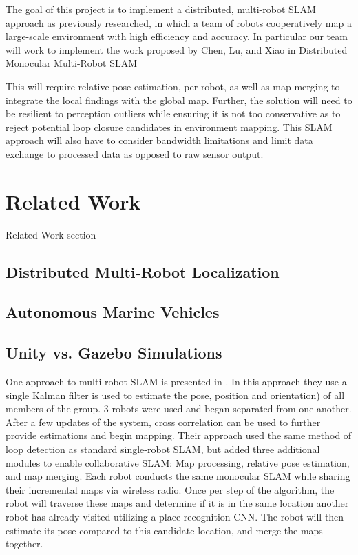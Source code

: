 \documentclass[conference]{IEEEtran}
\begin{document}
The goal of this project is to implement a distributed, multi-robot SLAM approach as previously researched, in which a team of robots cooperatively map a large-scale environment with high efficiency and accuracy. In particular our team will work to implement the work proposed by Chen, Lu, and Xiao in Distributed Monocular Multi-Robot SLAM \cite{monocular}

This will require relative pose estimation, per robot, as well as map merging to integrate the local findings with the global map. Further, the solution will need to be resilient to perception outliers while ensuring it is not too conservative as to reject potential loop closure candidates in environment mapping. This SLAM approach will also have to consider bandwidth limitations and limit data exchange to processed data as opposed to raw sensor output. 


\section{Related Work}
Related Work section
\subsection{Distributed Multi-Robot Localization}
\subsection{Autonomous Marine Vehicles}
\subsection{Unity vs. Gazebo Simulations}

One approach to multi-robot SLAM is presented in \cite{1067998}. In this approach they use a single Kalman filter is used to estimate the pose, position and orientation) of all members of the group. 3 robots were used and began separated from one another. After a few updates of the system, cross correlation can be used to further provide estimations and begin mapping. Their approach used the same method of loop detection as standard single-robot SLAM, but added three additional modules to enable collaborative SLAM: Map processing, relative pose estimation, and map merging. Each robot conducts the same monocular SLAM while sharing their incremental maps via wireless radio. Once per step of the algorithm, the robot will traverse these maps and determine if it is in the same location another robot has already visited utilizing a place-recognition CNN. The robot will then estimate its pose compared to this candidate location, and merge the maps together.
\end{document}
